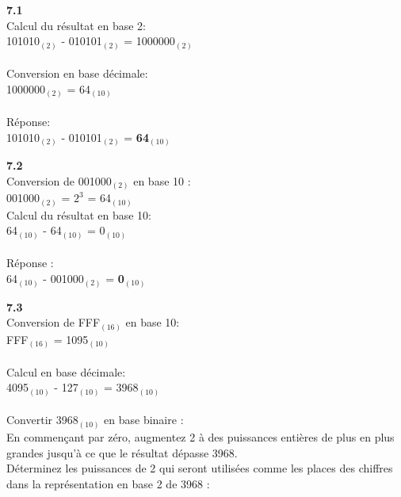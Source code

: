 \begin{Exercice}[20 minutes]
\begin{conseil}
        
    \end{conseil}
    \begin{solution} \textbf{7.1}\\
        Calcul du résultat en base 2:\\
        101010$_{(2)}$ - 010101$_{(2)}$ = 1000000$_{(2)}$\\\\
        Conversion en base décimale:\\
        1000000$_{(2)}$ = 64$_{(10)}$\\\\
        Réponse:\\
        101010$_{(2)}$ - 010101$_{(2)}$ = \textbf{64$_{(10)}$}\\
    \end{solution}
    
    \begin{solution} \textbf{7.2}\\
        Conversion de 001000$_{(2)}$ en base 10 :\\
        001000$_{(2)}$ = $2^3$ = 64$_{(10)}$\\
        
        Calcul du résultat en base 10:\\
        64$_{(10)}$ - 64$_{(10)}$ = 0$_{(10)}$\\\\
        
        Réponse : \\
        64$_{(10)}$ - 001000$_{(2)}$ = \textbf{0$_{(10)}$}

    \end{solution}
    
    \begin{solution} \textbf{7.3}\\
        Conversion de FFF$_{(16)}$ en base 10:\\
        FFF$_{(16)}$ = 1095$_{(10)}$\\\\
        Calcul en base décimale:\\
        4095$_{(10)}$ - 127$_{(10)}$ = 3968$_{(10)}$\\\\
        Convertir 3968$_{(10)}$ en base binaire :\\
        En commençant par zéro, augmentez 2 à des puissances entières de plus en plus grandes jusqu'à ce que le résultat dépasse 3968.\\
        Déterminez les puissances de 2 qui seront utilisées comme les places des chiffres dans la représentation en base 2 de 3968 :\\


\end{solution}
\end{Exercice}
